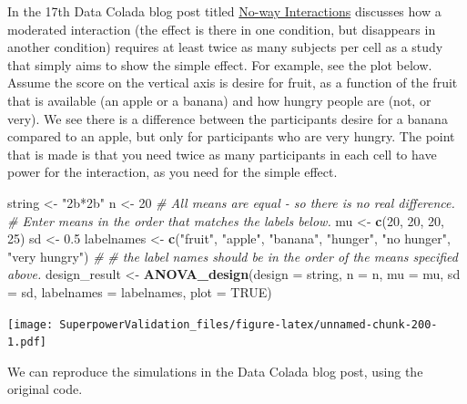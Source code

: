 \documentclass[
]{book}
\newenvironment{Shaded}{\begin{snugshade}}{\end{snugshade}}
\newcommand{\CommentTok}[1]{\textcolor[rgb]{0.56,0.35,0.01}{\textit{#1}}}
\newcommand{\DataTypeTok}[1]{\textcolor[rgb]{0.13,0.29,0.53}{#1}}
\newcommand{\DecValTok}[1]{\textcolor[rgb]{0.00,0.00,0.81}{#1}}
\newcommand{\FloatTok}[1]{\textcolor[rgb]{0.00,0.00,0.81}{#1}}
\newcommand{\KeywordTok}[1]{\textcolor[rgb]{0.13,0.29,0.53}{\textbf{#1}}}
\newcommand{\NormalTok}[1]{#1}
\newcommand{\OtherTok}[1]{\textcolor[rgb]{0.56,0.35,0.01}{#1}}
\newcommand{\StringTok}[1]{\textcolor[rgb]{0.31,0.60,0.02}{#1}}
\begin{document}
In the 17th Data Colada blog post titled \href{http://datacolada.org/17}{No-way Interactions} \citet{simonsohn_2014} discusses how a moderated interaction (the effect is there in one condition, but disappears in another condition) requires at least twice as many subjects per cell as a study that simply aims to show the simple effect. For example, see the plot below. Assume the score on the vertical axis is desire for fruit, as a function of the fruit that is available (an apple or a banana) and how hungry people are (not, or very). We see there is a difference between the participants desire for a banana compared to an apple, but only for participants who are very hungry. The point that is made is that you need twice as many participants in each cell to have power for the interaction, as you need for the simple effect.

\begin{Shaded}
\begin{Highlighting}[]
\NormalTok{string <-}\StringTok{ "2b*2b"}
\NormalTok{n <-}\StringTok{ }\DecValTok{20}
\CommentTok{# All means are equal - so there is no real difference.}
\CommentTok{# Enter means in the order that matches the labels below.}
\NormalTok{mu <-}\StringTok{ }\KeywordTok{c}\NormalTok{(}\DecValTok{20}\NormalTok{, }\DecValTok{20}\NormalTok{, }\DecValTok{20}\NormalTok{, }\DecValTok{25}\NormalTok{) }
\NormalTok{sd <-}\StringTok{ }\FloatTok{0.5}
\NormalTok{labelnames <-}\StringTok{ }\KeywordTok{c}\NormalTok{(}\StringTok{"fruit"}\NormalTok{, }\StringTok{"apple"}\NormalTok{, }\StringTok{"banana"}\NormalTok{, }
                \StringTok{"hunger"}\NormalTok{, }\StringTok{"no hunger"}\NormalTok{, }\StringTok{"very hungry"}\NormalTok{) }\CommentTok{#}
\CommentTok{# the label names should be in the order of the means specified above.}
\NormalTok{design_result <-}\StringTok{ }\KeywordTok{ANOVA_design}\NormalTok{(}\DataTypeTok{design =}\NormalTok{ string,}
                   \DataTypeTok{n =}\NormalTok{ n, }
                   \DataTypeTok{mu =}\NormalTok{ mu, }
                   \DataTypeTok{sd =}\NormalTok{ sd, }
                   \DataTypeTok{labelnames =}\NormalTok{ labelnames,}
                   \DataTypeTok{plot =} \OtherTok{TRUE}\NormalTok{)}
\end{Highlighting}
\end{Shaded}

\texttt{[image: SuperpowerValidation\_files/figure-latex/unnamed-chunk-200-1.pdf]}

We can reproduce the simulations in the Data Colada blog post, using the original code.
\end{document}
